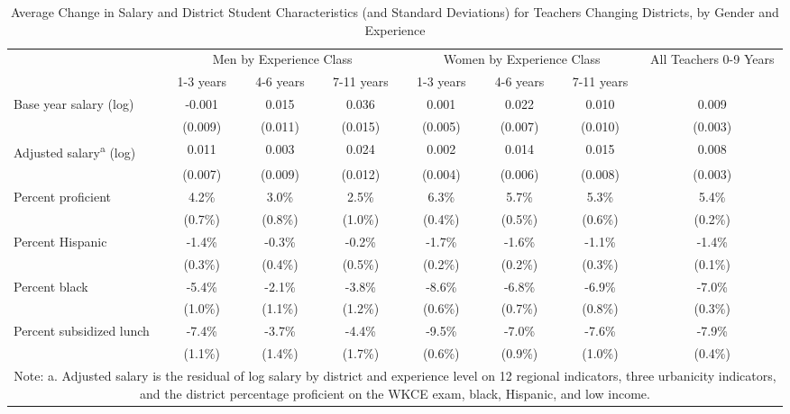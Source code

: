 \documentclass[12pt,]{article}
\begin{document}
\begin{sidewaystable}[htbp]
\centering
\begin{tabular}{lccccccc}
  \hline
 & \multicolumn{3}{c}{Men by Experience Class} & \multicolumn{3}{c}{Women by Experience Class} & \multirow{2}{*}{\parbox{0.1\linewidth}{All Teachers 0-9 Years}}\\ \cline{2-4} \cline{5-7}
 & 1-3 years & 4-6 years & 7-11 years & 1-3 years & 4-6 years & 7-11 years &  \\ 
  \hline
Base year salary (log) & -0.001 & 0.015 & 0.036 & 0.001 & 0.022 & 0.010 & 0.009 \\ 
   & (0.009) & (0.011) & (0.015) & (0.005) & (0.007) & (0.010) & (0.003) \\ 
  Adjusted salary\textsuperscript{a} (log) & 0.011 & 0.003 & 0.024 & 0.002 & 0.014 & 0.015 & 0.008 \\ 
   & (0.007) & (0.009) & (0.012) & (0.004) & (0.006) & (0.008) & (0.003) \\ 
  Percent proficient & 4.2\% & 3.0\% & 2.5\% & 6.3\% & 5.7\% & 5.3\% & 5.4\% \\ 
   & (0.7\%) & (0.8\%) & (1.0\%) & (0.4\%) & (0.5\%) & (0.6\%) & (0.2\%) \\ 
  Percent Hispanic & -1.4\% & -0.3\% & -0.2\% & -1.7\% & -1.6\% & -1.1\% & -1.4\% \\ 
   & (0.3\%) & (0.4\%) & (0.5\%) & (0.2\%) & (0.2\%) & (0.3\%) & (0.1\%) \\ 
  Percent black & -5.4\% & -2.1\% & -3.8\% & -8.6\% & -6.8\% & -6.9\% & -7.0\% \\ 
   & (1.0\%) & (1.1\%) & (1.2\%) & (0.6\%) & (0.7\%) & (0.8\%) & (0.3\%) \\ 
  Percent subsidized lunch & -7.4\% & -3.7\% & -4.4\% & -9.5\% & -7.0\% & -7.6\% & -7.9\% \\ 
   & (1.1\%) & (1.4\%) & (1.7\%) & (0.6\%) & (0.9\%) & (1.0\%) & (0.4\%) \\ 
   \hline
\multicolumn{8}{c}{\parbox{0.85\linewidth}{\scriptsize{Note: a. Adjusted salary is the residual of log salary by district and experience level on 12 regional indicators, three urbanicity indicators, and the district percentage proficient on the WKCE exam, black, Hispanic, and low income.}}}\\
\end{tabular}
\caption{Average Change in Salary and District Student Characteristics (and Standard Deviations) for Teachers Changing Districts, by Gender and Experience} 
\label{tbl:change_by_ge}
\end{sidewaystable}
\end{document}
